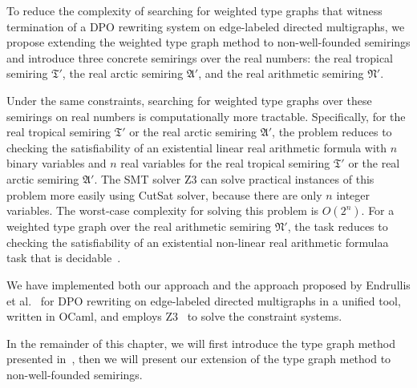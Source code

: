 To reduce the complexity of searching for weighted type graphs that witness termination of a DPO rewriting system on edge-labeled directed multigraphs, we propose extending the weighted type graph method to non-well-founded semirings and introduce three concrete semirings over the real numbers: the real tropical semiring $\mathfrak{T}'$, the real arctic semiring $\mathfrak{A}'$, and the real arithmetic semiring $\mathfrak{N}'$. 


Under the same constraints, searching for weighted type graphs over these semirings on real numbers is computationally more tractable. Specifically,
for the real tropical semiring $\mathfrak{T}'$ or the real arctic semiring $\mathfrak{A}'$, the problem reduces 
to checking the satisfiability of an 
existential linear real arithmetic formula with $n$ binary variables and $n$ real variables for the real tropical semiring $\mathfrak{T}'$ or the real arctic semiring $\mathfrak{A}'$. 
The SMT solver Z3 can solve practical instances of this problem more easily using CutSat solver, because there are only $n$ integer variables. The worst-case complexity for solving this problem is $O(2^n)$.
For a weighted type graph over the real arithmetic semiring $\mathfrak{N}'$, the task reduces to checking the satisfiability of 
an existential non-linear real arithmetic formula\textemdash a task that is decidable~\cite{collins1974quantifier,z3realarithmetic}.


We have implemented both our approach and the approach proposed by Endrullis et al.~\cite{endrullis2024generalized_arxiv_v2} for DPO rewriting on edge-labeled directed multigraphs in a unified tool, written in OCaml, and employs Z3~\cite{de2008z3} to solve the constraint systems.

In the remainder of this chapter, we will first introduce the type graph method presented in~\cite{endrullis2024generalized_arxiv_v2}, then we will present our extension of the type graph method to non-well-founded semirings.
